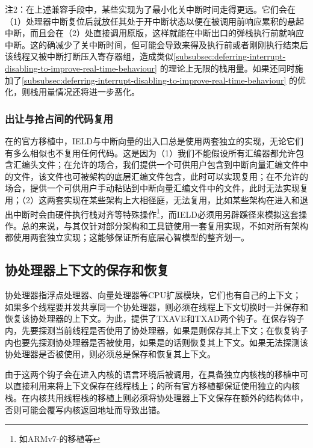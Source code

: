 注2：在上述兼容手段中，某些实现为了最小化关中断时间走得更远。它们会在（1）处理器中断复位后就放任其处于开中断状态以便在被调用前响应累积的悬起中断，而且会在（2）处直接调用原版，这样就能在中断出口的弹栈执行前就响应中断。这的确减少了关中断时间，但可能会导致来得及执行前或者刚刚执行结束后该线程又被中断打断压入寄存器组，造成类似\ref{subsubsec:deferring-interrupt-disabling-to-improve-real-time-behaviour}
的理论上无限的栈用量。如果还同时施加了\ref{subsubsec:deferring-interrupt-disabling-to-improve-real-time-behaviour}
的优化，则栈用量情况还将进一步恶化。

\subsubsection{出让与抢占间的代码复用}\label{subsubsec:reusing-code-between-yield-and-preemption}

在的官方移植中，IELD与中断向量的出入口总是使用两套独立的实现，无论它们有多么相似也不复用任何代码。这是因为（1）我们不能假设所有汇编器都允许包含汇编头文件；在允许的场合，我们提供一个可供用户包含到中断向量汇编文件中的文件，该文件也可被架构的底层汇编文件包含，此时可以实现复用；在不允许的场合，提供一个可供用户手动粘贴到中断向量汇编文件中的文件，此时无法实现复用；（2）这两套实现在某些架构上大相径庭，无法复用，比如某些架构在进入和退出中断时会由硬件执行栈对齐等特殊操作\footnote{如ARMv7-的移植等}，而IELD必须用另辟蹊径来模拟这套操作。总的来说，与其仅针对部分架构和工具链使用一套复用实现，不如对所有架构都使用两套独立实现；这能够保证所有底层心智模型的整齐划一。

\subsection{协处理器上下文的保存和恢复}\label{subsec:saving-and-restoring-coprocessor-context}

协处理器指浮点处理器、向量处理器等CPU扩展模块，它们也有自己的上下文；如果多个线程要并发共享同一个协处理器，则必须在线程上下文切换时一并保存和恢复该协处理器的上下文。为此，提供了TXAVE和TXAD两个钩子。在保存钩子内，先要探测当前线程是否使用了协处理器，如果是则保存其上下文；在恢复钩子内也要先探测协处理器是否被使用，如果是的话则恢复其上下文。如果无法探测该协处理器是否被使用，则必须总是保存和恢复其上下文。

由于这两个钩子会在进入内核的语言环境后被调用，在具备独立内核栈的移植中可以直接利用来将上下文保存在线程栈上；的所有官方移植都保证使用独立的内核栈。在内核共用线程栈的移植上则必须将协处理器上下文保存在额外的结构体中，否则可能会覆写内核返回地址而导致出错。

